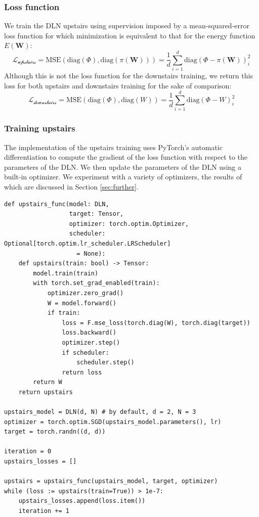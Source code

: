 \documentclass[11pt]{article}
\begin{document}
\subsubsection{Loss function}
We train the DLN upstairs using supervision imposed by a mean-squared-error loss function for which minimization is equivalent to that for the energy function $E\left(\bm{W}\right)$:
$$\mathcal{L_\text{upstairs}} = \text{MSE}\left(\text{diag}\left(\Phi\right), \text{diag}\left(\pi\left(\bm{W}\right)\right)\right) = \frac{1}{d}\sum_{i=1}^d \text{diag}\left(\Phi - \pi\left(\bm{W}\right)\right)_i^2$$
Although this is not the loss function for the downstairs training, we return this loss for both upstairs and downstairs training for the sake of comparison:
$$\mathcal{L_\text{downstairs}} = \text{MSE}\left(\text{diag}\left(\Phi\right), \text{diag}\left(W\right)\right) = \frac{1}{d}\sum_{i=1}^d \text{diag}\left(\Phi - W\right)_i^2$$

\subsubsection{Training upstairs}
The implementation of the upstairs training uses PyTorch's automatic differentiation to compute the gradient of the loss function with respect to the parameters of the DLN. We then update the parameters of the DLN using a built-in optimizer. We experiment with a variety of optimizers, the results of which are discussed in Section \ref{sec:further}.
\begin{verbatim}
def upstairs_func(model: DLN,
                  target: Tensor,
                  optimizer: torch.optim.Optimizer,
                  scheduler: Optional[torch.optim.lr_scheduler.LRScheduler]
                    = None):
    def upstairs(train: bool) -> Tensor:
        model.train(train)
        with torch.set_grad_enabled(train):
            optimizer.zero_grad()
            W = model.forward()
            if train:
                loss = F.mse_loss(torch.diag(W), torch.diag(target))
                loss.backward()
                optimizer.step()
                if scheduler:
                    scheduler.step()
                return loss
        return W
    return upstairs

upstairs_model = DLN(d, N) # by default, d = 2, N = 3
optimizer = torch.optim.SGD(upstairs_model.parameters(), lr)
target = torch.randn((d, d))

iteration = 0
upstairs_losses = []

upstairs = upstairs_func(upstairs_model, target, optimizer)
while (loss := upstairs(train=True)) > 1e-7:
    upstairs_losses.append(loss.item())
    iteration += 1
\end{verbatim}
\end{document}
